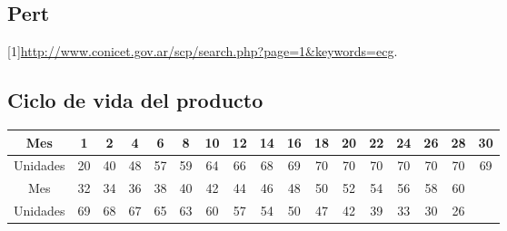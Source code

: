 \documentclass[12pt]{article}
\numberwithin{equation}{section}
\numberwithin{figure}{section}
\numberwithin{table}{section}
\begin{document}

\subsection{Pert}


[1]\href{http://www.conicet.gov.ar/scp/search.php?page=1&keywords=ecg}{http://www.conicet.gov.ar/scp/search.php?page=1\&keywords=ecg}.

\subsection{Ciclo de vida del producto}


\begin{tabular}{c | c | c | c | c | c | c | c | c | c | c | c | c | c | c | c | c | }
   Mes & 1 & 2 & 4 & 6 & 8 & 10 & 12 & 14 & 16 & 18 & 20 & 22 & 24 & 26 & 28 & 30\\
   \hline
   Unidades & 20 & 40 & 48 & 57 & 59 & 64 & 66 & 68 & 69 & 70 & 70 & 70 & 70 & 70 & 70 & 69\\
	\hline
   Mes  & 32 & 34 & 36 & 38 & 40 & 42 & 44 & 46 & 48 & 50 & 52 & 54 & 56 & 58 & 60 \\
	\hline
   Unidades  & 69 & 68 & 67 & 65 & 63 & 60 & 57 & 54 & 50 & 47 & 42 & 39 & 33 & 30 & 26 \\
\end{tabular}
\end{document}
